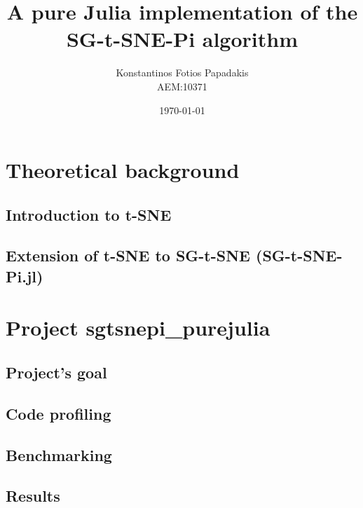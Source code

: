 \documentclass[twocolumn]{report}
\begin{document}
\title{\Huge \bfseries A pure Julia implementation of the SG-t-SNE-Pi algorithm} %
\author{Konstantinos Fotios Papadakis\vspace{0.5cm} \\  AEM:10371} %
\date{\today}
\maketitle

\tableofcontents



\chapter{Theoretical background}
\section{Introduction to t-SNE}

\section{Extension of t-SNE to SG-t-SNE (SG-t-SNE-Pi.jl)}


\chapter{Project sgtsnepi_purejulia}
\section{Project's goal}

\section{Code profiling}

\section{Benchmarking}

\section{Results}

\end{document}
